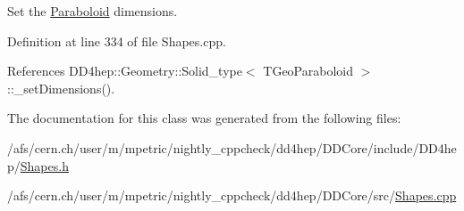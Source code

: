 Set the \hyperlink{class_d_d4hep_1_1_geometry_1_1_paraboloid}{Paraboloid} dimensions. 

Definition at line 334 of file Shapes.cpp.

References DD4hep::Geometry::Solid\_\-type$<$ TGeoParaboloid $>$::\_\-setDimensions().

The documentation for this class was generated from the following files:\begin{DoxyCompactItemize}
\item 
/afs/cern.ch/user/m/mpetric/nightly\_\-cppcheck/dd4hep/DDCore/include/DD4hep/\hyperlink{_shapes_8h}{Shapes.h}\item 
/afs/cern.ch/user/m/mpetric/nightly\_\-cppcheck/dd4hep/DDCore/src/\hyperlink{_shapes_8cpp}{Shapes.cpp}\end{DoxyCompactItemize}
